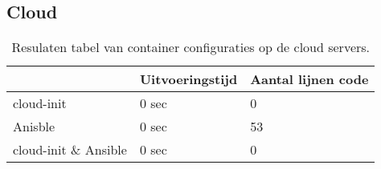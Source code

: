 \subsection{Cloud}

\begin{table}[!htb]
	\centering
	\begin{tabular}{| l | l | l |}
		\hline
		& \textbf{Uitvoeringstijd} & \textbf{Aantal lijnen code}  \\ \hline
		cloud-init & 0 sec & 0 \\ \hline
		Anisble & 0 sec & 53 \\ \hline
		cloud-init \& Ansible & 0 sec & 0 \\
		\hline
	\end{tabular}
	\caption{Resulaten tabel van container configuraties op de cloud servers.}
	\label{tab:tabel cloud resultaten container}
\end{table}

